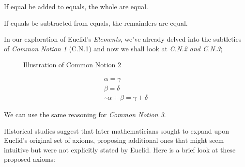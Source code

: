 \begin{cn}
If equal be added to equals, the whole are equal.
\end{cn}
\begin{cn}
If equals be subtracted from equals, the remainders are equal.
\end{cn}

In our exploration of Euclid's \textit{Elements}, we've already delved into the subtleties of \textit{Common Notion 1} (C.N.1) and now we shall look at \textit{C.N.2 and C.N.3};

\begin{figure}[H]
\centering
\begin{subfigure}{0.45\textwidth}
\centering
{}
\end{subfigure}%
\begin{subfigure}{0.45\textwidth}
\centering
{}
\end{subfigure}
\caption{Illustration of Common Notion 2}
\end{figure}

\begin{gather*}
\alpha = \gamma\\
\beta = \delta\\ 
\therefore \alpha + \beta = \gamma + \delta
\end{gather*}

We can use the same reasoning for \textit{Common Notion 3}.

Historical studies suggest that later mathematicians sought to expand upon Euclid's original set of axioms, proposing additional ones that might seem intuitive but were not explicitly stated by Euclid. Here is a brief look at these proposed axioms:

